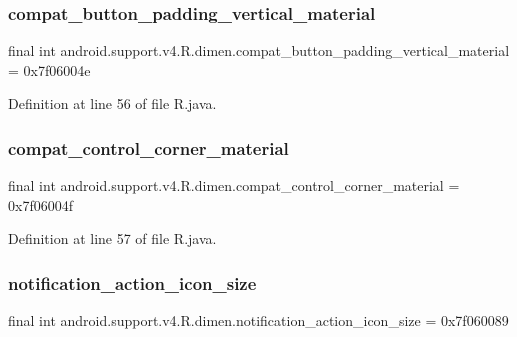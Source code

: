 \subsubsection{\texorpdfstring{compat\_button\_padding\_vertical\_material}{compat\_button\_padding\_vertical\_material}}
{\footnotesize\ttfamily final int android.\+support.\+v4.\+R.\+dimen.\+compat\+\_\+button\+\_\+padding\+\_\+vertical\+\_\+material = 0x7f06004e\hspace{0.3cm}{\ttfamily [static]}}



Definition at line 56 of file R.\+java.

\mbox{\label{classandroid_1_1support_1_1v4_1_1_r_1_1dimen_a5eabb5cd9f1fbb7332bd3e79ff77ff21}} 
\subsubsection{\texorpdfstring{compat\_control\_corner\_material}{compat\_control\_corner\_material}}
{\footnotesize\ttfamily final int android.\+support.\+v4.\+R.\+dimen.\+compat\+\_\+control\+\_\+corner\+\_\+material = 0x7f06004f\hspace{0.3cm}{\ttfamily [static]}}



Definition at line 57 of file R.\+java.

\mbox{\label{classandroid_1_1support_1_1v4_1_1_r_1_1dimen_a01ca2c6621abec7453a1df3e82fe49e0}} 
\subsubsection{\texorpdfstring{notification\_action\_icon\_size}{notification\_action\_icon\_size}}
{\footnotesize\ttfamily final int android.\+support.\+v4.\+R.\+dimen.\+notification\+\_\+action\+\_\+icon\+\_\+size = 0x7f060089\hspace{0.3cm}{\ttfamily [static]}}



